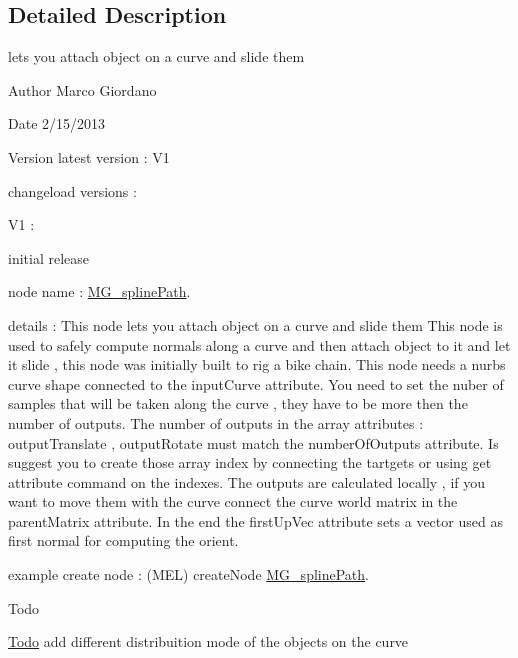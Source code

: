 \subsection{Detailed Description}
lets you attach object on a curve and slide them 

\begin{DoxyAuthor}{Author}
Marco Giordano 
\end{DoxyAuthor}
\begin{DoxyDate}{Date}
2/15/2013 
\end{DoxyDate}
\begin{DoxyVersion}{Version}
latest version \-: V1 

changeload versions \-: \par
 V1 \-: \par

\begin{DoxyItemize}
\item initial release \par

\end{DoxyItemize}
\end{DoxyVersion}
node name \-: \hyperlink{class_m_g__spline_path}{M\-G\-\_\-spline\-Path}.

details \-: This node lets you attach object on a curve and slide them This node is used to safely compute normals along a curve and then attach object to it and let it slide , this node was initially built to rig a bike chain. This node needs a nurbs curve shape connected to the input\-Curve attribute. You need to set the nuber of samples that will be taken along the curve , they have to be more then the number of outputs. The number of outputs in the array attributes \-: output\-Translate , output\-Rotate must match the number\-Of\-Outputs attribute. Is suggest you to create those array index by connecting the tartgets or using get attribute command on the indexes. The outputs are calculated locally , if you want to move them with the curve connect the curve world matrix in the parent\-Matrix attribute. In the end the first\-Up\-Vec attribute sets a vector used as first normal for computing the orient.

example create node \-: (M\-E\-L) create\-Node \hyperlink{class_m_g__spline_path}{M\-G\-\_\-spline\-Path}.

\begin{DoxyRefDesc}{Todo}
\item[\hyperlink{todo__todo000004}{Todo}]add different distribuition mode of the objects on the curve\end{DoxyRefDesc}


